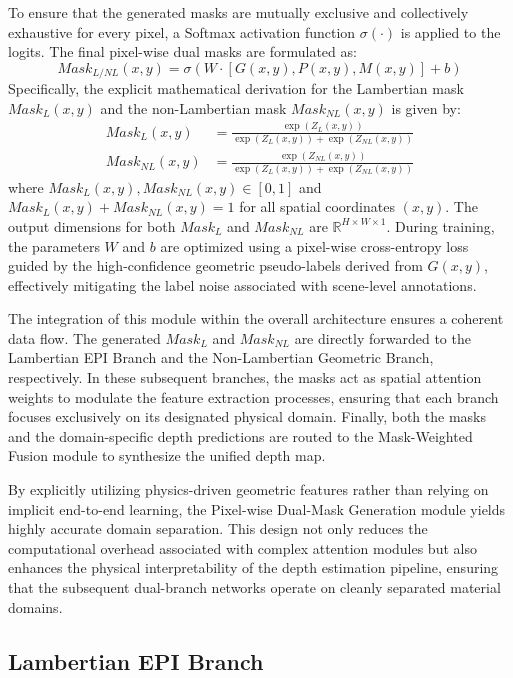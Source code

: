 \documentclass[lettersize,journal]{IEEEtran}
\begin{document}
To ensure that the generated masks are mutually exclusive and collectively exhaustive for every pixel, a Softmax activation function $\sigma(\cdot)$ is applied to the logits. The final pixel-wise dual masks are formulated as:
\begin{equation}
Mask_{L/NL}(x,y) = \sigma(W \cdot [G(x,y), P(x,y), M(x,y)] + b)
\end{equation}
Specifically, the explicit mathematical derivation for the Lambertian mask $Mask_L(x,y)$ and the non-Lambertian mask $Mask_{NL}(x,y)$ is given by:
\begin{align}
Mask_L(x,y) &= \frac{\exp(Z_L(x,y))}{\exp(Z_L(x,y)) + \exp(Z_{NL}(x,y))} \\
Mask_{NL}(x,y) &= \frac{\exp(Z_{NL}(x,y))}{\exp(Z_L(x,y)) + \exp(Z_{NL}(x,y))}
\end{align}
where $Mask_L(x,y), Mask_{NL}(x,y) \in [0, 1]$ and $Mask_L(x,y) + Mask_{NL}(x,y) = 1$ for all spatial coordinates $(x,y)$. The output dimensions for both $Mask_L$ and $Mask_{NL}$ are $\mathbb{R}^{H \times W \times 1}$. During training, the parameters $W$ and $b$ are optimized using a pixel-wise cross-entropy loss guided by the high-confidence geometric pseudo-labels derived from $G(x,y)$, effectively mitigating the label noise associated with scene-level annotations.

The integration of this module within the overall architecture ensures a coherent data flow. The generated $Mask_L$ and $Mask_{NL}$ are directly forwarded to the Lambertian EPI Branch and the Non-Lambertian Geometric Branch, respectively. In these subsequent branches, the masks act as spatial attention weights to modulate the feature extraction processes, ensuring that each branch focuses exclusively on its designated physical domain. Finally, both the masks and the domain-specific depth predictions are routed to the Mask-Weighted Fusion module to synthesize the unified depth map.

By explicitly utilizing physics-driven geometric features rather than relying on implicit end-to-end learning, the Pixel-wise Dual-Mask Generation module yields highly accurate domain separation. This design not only reduces the computational overhead associated with complex attention modules but also enhances the physical interpretability of the depth estimation pipeline, ensuring that the subsequent dual-branch networks operate on cleanly separated material domains.

\subsection{Lambertian EPI Branch}
\end{document}
